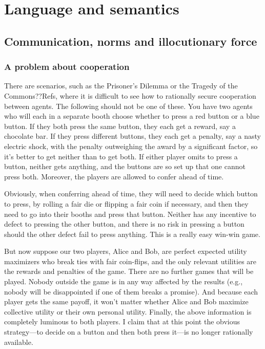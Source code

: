 \def\mychapter{VII}

\chapter{Language and semantics}\label{ch:semantics}
\section{Communication, norms and illocutionary force}
\subsection{A problem about cooperation}
There are scenarios, such as the Prisoner's Dilemma or the Tragedy of the Commons??Refs, where it is difficult 
to see how to rationally secure cooperation between agents. The following should not be one of these. You have
two agents who will each in a separate booth choose whether to press a red button or a blue button. If they both
press the same button, they each get a reward, say a chocolate bar. If they press different buttons, they 
each get a penalty, say a nasty electric shock, with the penalty outweighing the award by a significant factor, so it's better 
to get neither than to get both. If either player omits to press a button, neither gets anything, and the buttons are so 
set up that one cannot press both. Moreover, the players are allowed to confer ahead of time.

Obviously, when conferring ahead of time, they will need to decide which button to press, by rolling a fair die or
flipping a fair coin if
necessary, and then they need to go into their booths and press that button. Neither has any incentive to defect
to pressing the other button, and there is no risk in pressing a button should the other defect fail to press
anything. This is a really easy win-win game. 

But now suppose our two players, Alice and Bob, are perfect expected utility maximizers who break ties with fair coin-flips, 
and the only relevant utilities are the  rewards and penalties of the game. There are no further games that 
will be played. Nobody outside the game is in any way affected by the results (e.g., nobody will be disappointed 
if one of them breaks a promise). And because each player gets the same payoff, it won't matter whether Alice and Bob
maximize collective utility or their own personal utility. Finally, the above information is completely luminous to 
both players. I claim that at this point the obvious strategy---to decide on a button and then both press it---is no 
longer rationally available.

